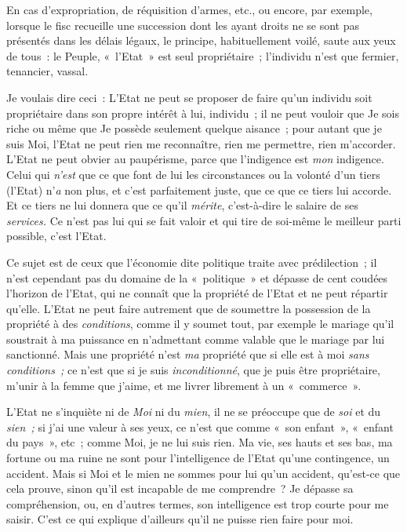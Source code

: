 \documentclass[french,twoside]{book} %
\begin{document}
En cas d’expropriation, de réquisition d’armes, etc., ou encore, par exemple, lorsque le fisc recueille une succession dont les ayant droits ne se sont pas présentés dans les délais légaux, le principe, habituellement voilé, saute aux yeux de tous : le Peuple, « l’Etat » est seul propriétaire ; l’individu n’est que fermier, tenancier, vassal.\par
Je voulais dire ceci : L’Etat ne peut se proposer de faire qu’un individu soit propriétaire dans son propre intérêt à lui, individu ; il ne peut vouloir que Je sois riche ou même que Je possède seulement quelque aisance ; pour autant que je suis Moi, l’Etat ne peut rien me reconnaître, rien me permettre, rien m’accorder. L’Etat ne peut obvier au paupérisme, parce que l’indigence est \emph{mon} indigence.  Celui qui \emph{n’est} que ce que font de lui les circonstances ou la volonté d’un tiers (l’Etat) n’\emph{a} non plus, et c’est parfaitement juste, que ce que ce tiers lui accorde. Et ce tiers ne lui donnera que ce qu’il \emph{mérite}, c’est-à-dire le salaire de ses \emph{services.} Ce n’est pas lui qui se fait valoir et qui tire de soi-même le meilleur parti possible, c’est l’Etat.\par
Ce sujet est de ceux que l’économie dite politique traite avec prédilection ; il n’est cependant pas du domaine de la « politique » et dépasse de cent coudées l’horizon de l’Etat, qui ne connaît que la propriété de l’Etat et ne peut répartir qu’elle. L’Etat ne peut faire autrement que de soumettre la possession de la propriété à des \emph{conditions}, comme il y soumet tout, par exemple le mariage qu’il soustrait à ma puissance en n’admettant comme valable que le mariage par lui sanctionné. Mais une propriété n’est \emph{ma} propriété que si elle est à moi \emph{sans conditions ;} ce n’est que si je suis \emph{inconditionné}, que je puis être propriétaire, m’unir à la femme que j’aime, et me livrer librement à un « commerce ».\par
L’Etat ne s’inquiète ni de \emph{Moi} ni du \emph{mien}, il ne se préoccupe que de \emph{soi} et du \emph{sien ;} si j’ai une valeur à ses yeux, ce n’est que comme « son enfant », « enfant du pays », etc ; comme Moi, je ne lui suis rien. Ma vie, ses hauts et ses bas, ma fortune ou ma ruine ne sont pour l’intelligence de l’Etat qu’une contingence, un accident. Mais si Moi et le mien ne sommes pour lui qu’un accident, qu’est-ce que cela prouve, sinon qu’il est incapable de me comprendre ? Je dépasse sa compréhension, ou, en d’autres termes, son intelligence est trop courte pour me saisir. C’est ce qui explique d’ailleurs qu’il ne puisse rien faire pour moi.\par
\end{document}
